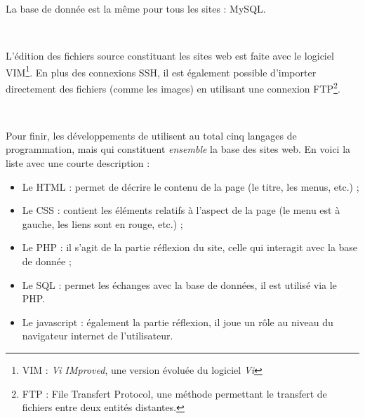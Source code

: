 La base de donnée est la même pour tous les sites : MySQL.

~

L'édition des fichiers source constituant les sites web est faite avec le logiciel VIM\footnote{VIM : \emph{Vi IMproved}, une version évoluée du logiciel \emph{Vi}}. En plus des connexions SSH, il est également possible d'importer directement des fichiers (comme les images) en utilisant une connexion FTP\footnote{FTP : File Transfert Protocol, une méthode permettant le transfert de fichiers entre deux entités distantes.}.

~

Pour finir, les développements de \fidit{} utilisent au total cinq langages de programmation, mais qui constituent \emph{ensemble} la base des sites web. En voici la liste avec une courte description :
\begin{itemize}
	\item Le HTML : permet de décrire le contenu de la page (le titre, les menus, etc.) ;
	\item Le CSS : contient les éléments relatifs à l'aspect de la page (le menu est à gauche, les liens sont en rouge, etc.) ;
	\item Le PHP : il s'agit de la partie \og réflexion \fg du site, celle qui interagit avec la base de donnée ;
	\item Le SQL : permet les échanges avec la base de données, il est utilisé via le PHP.
	\item Le javascript : également la partie réflexion, il joue un rôle au niveau du navigateur internet de l'utilisateur.
\end{itemize}
